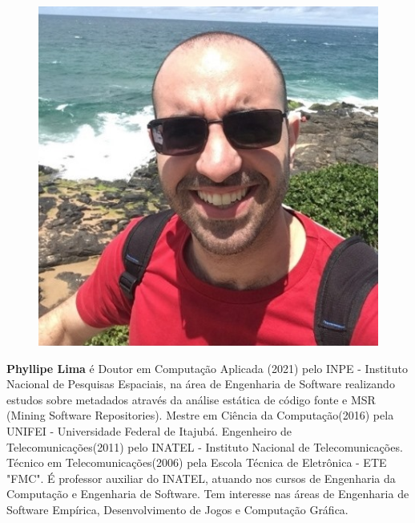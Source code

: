 \begin{figure}
\includegraphics[width=\linewidth]{figuras/autor3.png}
\end{figure}

    \textbf{Phyllipe Lima} é Doutor em Computação Aplicada (2021) pelo INPE - Instituto Nacional de Pesquisas Espaciais, na área de Engenharia de Software realizando estudos sobre metadados através da análise estática de código fonte e MSR (Mining Software Repositories). Mestre em Ciência da Computação(2016) pela UNIFEI - Universidade Federal de Itajubá. Engenheiro de Telecomunicações(2011) pelo INATEL - Instituto Nacional de Telecomunicações.  Técnico em Telecomunicações(2006) pela Escola Técnica de Eletrônica - ETE "FMC". É professor auxiliar do INATEL, atuando nos cursos de Engenharia da Computação e Engenharia de Software. Tem interesse nas áreas de Engenharia de Software Empírica, Desenvolvimento de Jogos e Computação Gráfica.


   
   
   
   
   

